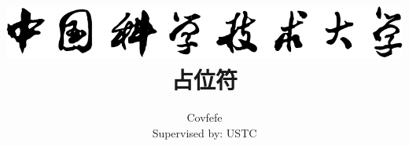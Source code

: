 \usepackage[utf8]{inputenc}
\usepackage{graphicx}
\usepackage[a4paper,width=150mm,top=25mm,bottom=25mm]{geometry}
\usepackage[UTF8]{ctex}
\usepackage{xcolor}  
\usepackage{tikz}
\usepackage{pst-blur}
\usepackage{pstricks-add}
\usepackage{unicode-math}
\usepackage[ruled,linesnumbered]{algorithm2e}
\usepackage{enumitem}
\usetikzlibrary{arrows,shapes,chains}
\usepackage{titlesec}
\titlespacing{\subsubsection}{0pt}{9pt}{-30pt}
\usepackage{hyperref}

\newcommand{\thirdchapterurl}{}

\graphicspath{{figures/}}

\title{
    {\includegraphics[]{logo.pdf}}\\
    {占位符}
}


\author{Covfefe \\ Supervised by: USTC}

